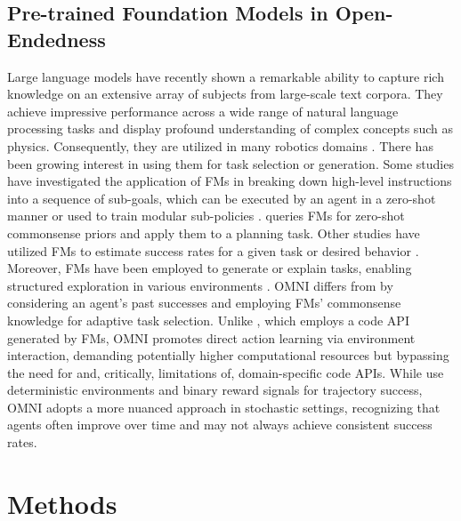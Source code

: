 \documentclass{article} %
\begin{document}
\subsection{Pre-trained Foundation Models in Open-Endedness}
Large language models have recently shown a remarkable ability to capture rich knowledge on an extensive array of subjects from large-scale text corpora. They achieve impressive performance across a wide range of natural language processing tasks \citep{gpt3, openai2023gpt4, devlin2019bert, liu2019roberta, min2021recent, li2022systematic, colas2023augmenting} and display profound understanding of complex concepts such as physics. Consequently, they are utilized in many robotics domains \citep{huang2022inner, huang2022language, ahn2022i, yang2023foundation, lynch2021language, sharma2022skill, kant2022, kwon2023reward, du2023, driess2023palm}. There has been growing interest in using them for task selection or generation. Some studies have investigated the application of FMs in breaking down high-level instructions into a sequence of sub-goals, which can be executed by an agent in a zero-shot manner \citep{huang2022inner, huang2022language, ahn2022i, yang2023foundation, colas2023augmenting, zhu2023ghost} or used to train modular sub-policies \citep{lynch2021language, sharma2022skill}. \citet{kant2022} queries FMs for zero-shot commonsense priors and apply them to a planning task. Other studies have utilized FMs to estimate success rates for a given task or desired behavior \citep{kwon2023reward, du2023, colas2023augmenting, wang2023voyager, wang2023describe}. Moreover, FMs have been employed to generate or explain tasks, enabling structured exploration in various environments \citep{du2023, colas2023augmenting, wang2023voyager, wang2023describe, yuan2023plan4mc}. OMNI differs from \citet{du2023} by considering an agent's past successes and employing FMs' commonsense knowledge for adaptive task selection. Unlike \citet{wang2023voyager}, which employs a code API generated by FMs, OMNI promotes direct action learning via environment interaction, demanding potentially higher computational resources but bypassing the need for and, critically, limitations of, domain-specific code APIs. While \citet{colas2023augmenting} use deterministic environments and binary reward signals for trajectory success, OMNI adopts a more nuanced approach in stochastic settings, recognizing that agents often improve over time and may not always achieve consistent success rates.

\section{Methods}
\end{document}
